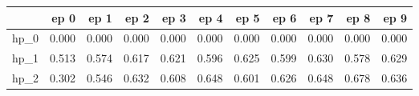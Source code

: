 \begin{tabular}{lrrrrrrrrrr}
\toprule
{} &   ep 0 &   ep 1 &   ep 2 &   ep 3 &   ep 4 &   ep 5 &   ep 6 &   ep 7 &   ep 8 &   ep 9 \\
\midrule
hp\_0 &  0.000 &  0.000 &  0.000 &  0.000 &  0.000 &  0.000 &  0.000 &  0.000 &  0.000 &  0.000 \\
hp\_1 &  0.513 &  0.574 &  0.617 &  0.621 &  0.596 &  0.625 &  0.599 &  0.630 &  0.578 &  0.629 \\
hp\_2 &  0.302 &  0.546 &  0.632 &  0.608 &  0.648 &  0.601 &  0.626 &  0.648 &  0.678 &  0.636 \\
\bottomrule
\end{tabular}
